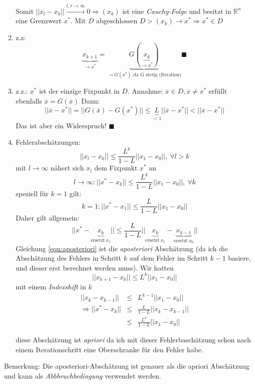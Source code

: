 \documentclass[10pt,a4paper]{article}
\begin{document}
\begin{enumerate}
Somit $||x_l-x_k|| \stackrel{l,r \rightarrow \infty}{\rightarrow} 0 \Rightarrow (x_k) $ ist eine \emph{Cauchy-Folge} und besitzt in $\mathbb{R}^{n}$ eine Grenzwert $x^{*}$. Mit $D$ abgeschlossen $D > (x_k) \rightarrow x^{*} \Rightarrow x^{*} \in D$
\item z.z: $$\underbrace{x_{k+1}}_{\rightarrow x^{*}}=\underbrace{G(\underbrace{x_k}_{\rightarrow x^{*}})}_{\rightarrow G(x^{*}), \text{da G stetig (Iteration)}} \blacksquare$$
\item z.z.: $x^{*}$ ist der einzige Fixpunkt in $D$. Annahme: $\overline{x} \in D, \overline{x} \not= x^{*}$ erfüllt ebenfalls $\overline{x}=G(\overline{x})$ Dann:
 $$||\overline{x}-x^{*}||=||G(\overline{x})-G(x^{*})|| \leq \underbrace{L}_{<1} ||\overline{x}-x^{*}|| < ||\overline{x}-x^{*}|| $$ Das ist aber ein Widerspruch! $\blacksquare$
\item Fehlerabschätzungen: $$||x_l-x_k|| \leq \frac{L^{k}}{1-L} ||x_1-x_0||, ~ \forall l>k$$ mit $l \rightarrow \infty$ nähert sich $x_l$ dem Fixpunkt $x^{*}$ an $$l \rightarrow \infty: ||x^{*}-x_k||\leq \frac{L^{k}}{1-L} ||x_1-x_0|| ,~ \forall k $$ speziell für $k=1$ gilt: $$ k=1: ||x^{*}-x_1|| \leq  \frac{L}{1-L} ||x_1-x_0||$$ Daher gilt allgemein: \begin{equation} \label{eqn:aposteriori} ||x^{*}-\underbrace{x_k}_{\text{ersetzt} ~ x_1}|| \leq \frac{L}{1-L} ||\underbrace{x_k}_{\text{ersetzt} ~ x_1} - \underbrace{x_{k-1}}_{\text{ersetzt} ~ x_0}|| \end{equation} Gleichung \ref{eqn:aposteriori} ist die \emph{aposteriori} Abschätzung (da ich die Abschätzung des Fehlers in Schritt $k$ auf dem Fehler im Schritt $k-1$ basiere, und dieser erst berechnet werden muss). Wir hatten $$||x_{k+1}-x_k|| \leq L^{k}||x_1-x_0||$$ mit einem \emph{Indexshift} in $k$
\begin{eqnarray*}
||x_k-x_{k-1}|| & \leq & L^{k-1} ||x_1-x_0|| \\
\Rightarrow  ||x^{*}-x_k|| &\leq & \frac{L}{1-L}||x_k-x_{k-1}|| \\
&\leq & \frac{L^{k}}{1-L} ||x_1-x_0||
\end{eqnarray*}


diese Abschätzung ist \emph{apriori} da ich mit dieser Fehlerbaschätzung schon nach einem Iterationschritt eine Oberschranke für den Fehler habe.
\end{enumerate}

Bemerkung: Die aposteriori-Abschätzung ist genauer als die apriori Abschätzung und kann als \emph{Abbbruchbedingung} verwendet werden.
\end{document}
